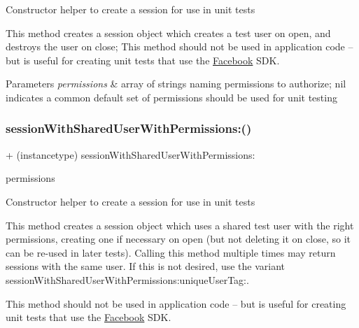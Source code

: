 Constructor helper to create a session for use in unit tests

This method creates a session object which creates a test user on open, and destroys the user on close; This method should not be used in application code -- but is useful for creating unit tests that use the \hyperlink{interfaceFacebook}{Facebook} S\+DK.


\begin{DoxyParams}{Parameters}
{\em permissions} & array of strings naming permissions to authorize; nil indicates a common default set of permissions should be used for unit testing \\
\hline
\end{DoxyParams}
\mbox{\label{interfaceFBTestSession_a27f8f36ddb23ea218117bc2e927d8039}} 
\subsubsection{\texorpdfstring{session\+With\+Shared\+User\+With\+Permissions\+:()}{sessionWithSharedUserWithPermissions:()}\hspace{0.1cm}{\footnotesize\ttfamily [1/5]}}
{\footnotesize\ttfamily + (instancetype) session\+With\+Shared\+User\+With\+Permissions\+: \begin{DoxyParamCaption}\item[{(N\+S\+Array $\ast$)}]{permissions }\end{DoxyParamCaption}}

Constructor helper to create a session for use in unit tests

This method creates a session object which uses a shared test user with the right permissions, creating one if necessary on open (but not deleting it on close, so it can be re-\/used in later tests). Calling this method multiple times may return sessions with the same user. If this is not desired, use the variant session\+With\+Shared\+User\+With\+Permissions\+:unique\+User\+Tag\+:.

This method should not be used in application code -- but is useful for creating unit tests that use the \hyperlink{interfaceFacebook}{Facebook} S\+DK.


